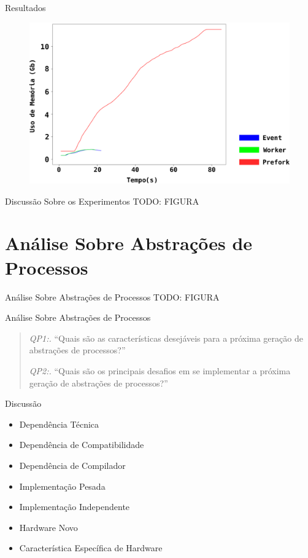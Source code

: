 \documentclass[xcolor={usenames,svgnames,dvipsnames},brazil,english,12pt,aspectratio=149]{beamer}
\begin{document}
\begin{frame}{Resultados}
  \begin{figure}[!h]
    \centering
    \includegraphics[width=.7\textwidth]{dynamic_file_memory_usage}
  \end{figure}
\end{frame}

\begin{frame}{Discussão Sobre os Experimentos}
  TODO: FIGURA
\end{frame}

\section{Análise Sobre Abstrações de Processos}

\begin{frame}{Análise Sobre Abstrações de Processos}
  TODO: FIGURA
\end{frame}

\begin{frame}{Análise Sobre Abstrações de Processos}
  \begin{quote}
   \item \textit{QP1:.} ``Quais são as características desejáveis para a próxima geração de abstrações de processos?''
   \item \textit{QP2:.} ``Quais são os principais desafios em se implementar a próxima geração de abstrações de processos?''
  \end{quote}
\end{frame}

\begin{frame}{Discussão}
  \begin{itemize}
    \item Dependência Técnica
    \item Dependência de Compatibilidade
    \item Dependência de Compilador
    \item Implementação Pesada
    \item Implementação Independente
    \item Hardware Novo
    \item Característica Específica de Hardware
  \end{itemize}
\end{frame}
\end{document}

